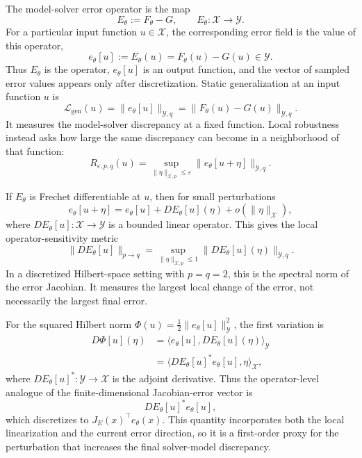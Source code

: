 \documentclass[letterpaper]{article} %
\begin{document}
The model-solver error operator is the map
\begin{equation}
  E_\theta := F_\theta - G,\qquad E_\theta:\mathcal{X}\to\mathcal{Y}.
\end{equation}
For a particular input function $u\in\mathcal{X}$, the corresponding error
field is the value of this operator,
\begin{equation}
  e_\theta[u] := E_\theta(u)=F_\theta(u)-G(u)\in\mathcal{Y}.
\end{equation}
Thus $E_\theta$ is the operator, $e_\theta[u]$ is an output function, and the
vector of sampled error values appears only after discretization. Static
generalization at an input function $u$ is
\begin{equation}
  \mathcal{L}_{\mathrm{gen}}(u)
  =
  \|e_\theta[u]\|_{\mathcal{Y},q}
  =
  \|F_\theta(u)-G(u)\|_{\mathcal{Y},q}.
\end{equation}
It measures the model-solver discrepancy at a fixed function. Local
robustness instead asks how large the same discrepancy can become in a
neighborhood of that function:
\begin{equation}
  R_{\varepsilon,p,q}(u)
  =
  \sup_{\|\eta\|_{\mathcal{X},p}\le\varepsilon}
  \|e_\theta[u+\eta]\|_{\mathcal{Y},q}.
\end{equation}

If $E_\theta$ is Frechet differentiable at $u$, then for small perturbations
\begin{equation}
  e_\theta[u+\eta]
  =
  e_\theta[u]+D E_\theta[u](\eta)+o(\|\eta\|_{\mathcal{X}}),
\end{equation}
where $D E_\theta[u]:\mathcal{X}\to\mathcal{Y}$ is a bounded linear operator.
This gives the local operator-sensitivity metric
\begin{equation}
  \|D E_\theta[u]\|_{p\to q}
  =
  \sup_{\|\eta\|_{\mathcal{X},p}\le 1}
  \|D E_\theta[u](\eta)\|_{\mathcal{Y},q}.
\end{equation}
In a discretized Hilbert-space setting with $p=q=2$, this is the spectral
norm of the error Jacobian. It measures the largest local change of the
error, not necessarily the largest final error.

For the squared Hilbert norm
$\Phi(u)=\frac{1}{2}\|e_\theta[u]\|_{\mathcal{Y}}^2$, the first variation is
\begin{align}
  D\Phi[u](\eta)
  &=
  \langle e_\theta[u],D E_\theta[u](\eta)\rangle_{\mathcal{Y}}
  \nonumber\\
  &=
  \langle D E_\theta[u]^*e_\theta[u],\eta\rangle_{\mathcal{X}},
\end{align}
where $D E_\theta[u]^*:\mathcal{Y}\to\mathcal{X}$ is the adjoint derivative.
Thus the operator-level analogue of the finite-dimensional
Jacobian-error vector is
\begin{equation}
  D E_\theta[u]^*e_\theta[u],
\end{equation}
which discretizes to $J_E(x)^\top e_\theta(x)$. This quantity incorporates both the
local linearization and the current error direction, so it is a first-order
proxy for the perturbation that increases the final solver-model discrepancy.
\end{document}
